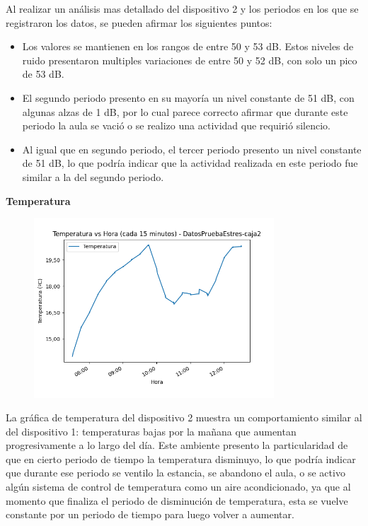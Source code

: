 \documentclass{templateNote}
\begin{document}
\begin{tcolorbox}
    Al realizar un análisis mas detallado del dispositivo 2 y los periodos en los que se registraron los datos, se pueden afirmar los siguientes puntos:
    \begin{itemize}
        \item Los valores se mantienen en los rangos de entre 50 y 53 dB. Estos niveles de ruido presentaron multiples variaciones de entre 50 y 52 dB, con solo un pico de 53 dB.
        \item El segundo periodo presento en su mayoría un nivel constante de 51 dB, con algunas alzas de 1 dB, por lo cual parece correcto afirmar que durante este periodo la aula se vació o se realizo una actividad que requirió silencio.
        \item Al igual que en segundo periodo, el tercer periodo presento un nivel constante de 51 dB, lo que podría indicar que la actividad realizada en este periodo fue similar a la del segundo periodo.
    \end{itemize}
\end{tcolorbox}

\newpage
\textbf{Temperatura}
\begin{figure}[H]
    \centering
    \includegraphics[width=0.8\textwidth]{img/DatosPruebaEstres-caja2_temperatura_vs_hora_15min.png}
\end{figure}
\begin{tcolorbox}
    La gráfica de temperatura del dispositivo 2 muestra un comportamiento similar al del dispositivo 1: temperaturas bajas por la mañana que aumentan progresivamente a lo largo del día. Este ambiente presento la particularidad de que en cierto periodo de tiempo la temperatura disminuyo, lo que podría indicar que durante ese periodo se ventilo la estancia, se abandono el aula, o se activo algún sistema de control de temperatura como un aire acondicionado, ya que al momento que finaliza el periodo de disminución de temperatura, esta se vuelve constante por un periodo de tiempo para luego volver a aumentar.
\end{tcolorbox}
\end{document}
